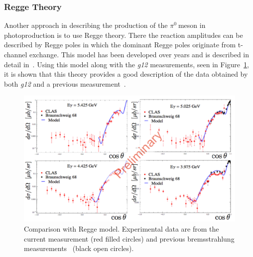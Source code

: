 \documentclass{aip-cp}
\def\g12{\emph{g12}}
\def\piz{$\pi^{0}\ $}
\begin{document}
\subsubsection{Regge Theory}
Another approach in describing the production of the \piz meson in photoproduction is to use Regge theory. There the reaction amplitudes can be described by Regge poles in which the dominant Regge poles originate from t-channel exchange. This model has been developed over  years and is described in detail in~\cite{JPAC}. Using this model along with the \g12 measurements, seen in Figure~\ref{fig:pi0_regge}, it is shown that this theory provides a good description of the data obtained by both \g12 and a previous measurement~\cite{brem}.
\begin{figure}[h]
	\centerline{\includegraphics[width=275 pt, height = 160 pt]{figures/pi0_regge.pdf}}
	\caption{Comparison with Regge model. Experimental data are from the current measurement (red filled circles) and previous bremsstrahlung measurements~\protect\cite{brem} (black open circles). }
	\label{fig:pi0_regge}
\end{figure}
\end{document}
